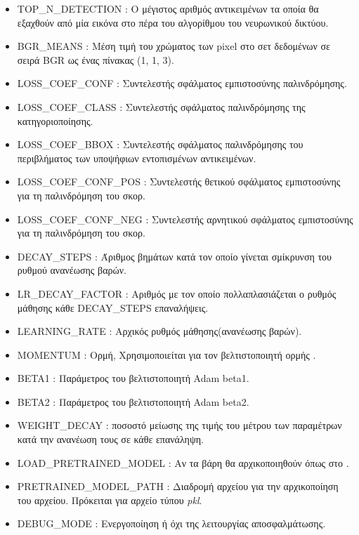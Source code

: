 \begin{itemize}
\item \textcolor{LstItemCol}{TOP\_N\_DETECTION} : Ο μέγιστος αριθμός αντικειμένων τα οποία θα εξαχθούν από μία εικόνα στο πέρα του αλγορίθμου του νευρωνικού δικτύου.
\item \textcolor{LstItemCol}{BGR\_MEANS} : Μέση τιμή του χρώματος των pixel στο σετ δεδομένων σε σειρά BGR ως ένας πίνακας (1, 1, 3).
\item \textcolor{LstItemCol}{LOSS\_COEF\_CONF} : Συντελεστής σφάλματος εμπιστοσύνης παλινδρόμησης.
\item \textcolor{LstItemCol}{LOSS\_COEF\_CLASS} : Συντελεστής σφάλματος παλινδρόμησης της κατηγοριοποίησης.
\item \textcolor{LstItemCol}{LOSS\_COEF\_BBOX} : Συντελεστής σφάλματος παλινδρόμησης του περιβλήματος των υποψήφιων εντοπισμένων αντικειμένων.
\item \textcolor{LstItemCol}{LOSS\_COEF\_CONF\_POS} : Συντελεστής θετικού σφάλματος εμπιστοσύνης για τη παλινδρόμηση του σκορ.
\item \textcolor{LstItemCol}{LOSS\_COEF\_CONF\_NEG} : Συντελεστής αρνητικού σφάλματος εμπιστοσύνης για τη παλινδρόμηση του σκορ. 
\item \textcolor{LstItemCol}{DECAY\_STEPS} : Άριθμος βημάτων κατά τον οποίο γίνεται σμίκρυνση του ρυθμού ανανέωσης βαρών.
\item \textcolor{LstItemCol}{LR\_DECAY\_FACTOR} : Αριθμός με τον οποίο πολλαπλασιάζεται ο ρυθμός μάθησης κάθε \textcolor{LstItemCol}{DECAY\_STEPS} επαναλήψεις.
\item \textcolor{LstItemCol}{LEARNING\_RATE} : Αρχικός ρυθμός μάθησης(ανανέωσης βαρών).
\item \textcolor{LstItemCol}{MOMENTUM} : Ορμή, Χρησιμοποιείται για τον βελτιστοποιητή ορμής \cite{42}.
\item \textcolor{LstItemCol}{BETA1} : Παράμετρος του βελτιστοποιητή Adam beta1.
\item \textcolor{LstItemCol}{BETA2} : Παράμετρος του βελτιστοποιητή Adam beta2.
\item \textcolor{LstItemCol}{WEIGHT\_DECAY} : ποσοστό μείωσης της τιμής του μέτρου των παραμέτρων κατά την ανανέωση τους σε κάθε επανάληψη.
\item \textcolor{LstItemCol}{LOAD\_PRETRAINED\_MODEL} : Αν τα βάρη θα αρχικοποιηθούν όπως στο \cite{1}.
\item \textcolor{LstItemCol}{PRETRAINED\_MODEL\_PATH} : Διαδρομή αρχείου για την αρχικοποίηση του αρχείου. Πρόκειται για αρχείο τύπου \textit{pkl}.
\item \textcolor{LstItemCol}{DEBUG\_MODE} : Ενεργοποίηση ή όχι της λειτουργίας αποσφαλμάτωσης.

\end{itemize}
